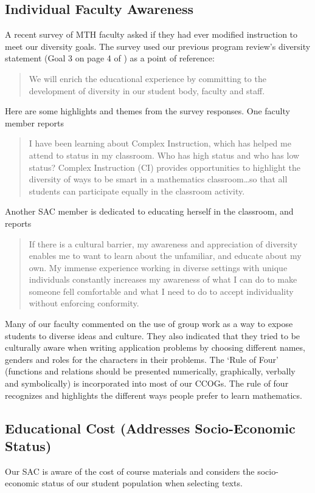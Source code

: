 \subsection{Individual Faculty Awareness}
A recent survey of MTH faculty asked if they had ever modified instruction to
meet our diversity goals. The survey used our previous program review's
diversity statement (Goal 3 on page 4 of \cite{mathprogramreview2003}) as a point of reference:
\begin{quote}
    We will enrich the educational experience by committing to the development
    of diversity in our student body, faculty and staff.
\end{quote}
Here are some highlights and themes from the survey responses. One faculty
member reports 
\begin{quote}
    I have been learning about Complex Instruction, which has helped me attend
    to status in my classroom. Who has high status and who has low status?
    Complex Instruction (CI) provides opportunities to highlight the diversity
    of ways to be smart in a mathematics classroom\ldots so that all students
    can participate equally in the classroom activity.
\end{quote}
Another SAC member is dedicated to educating herself in the classroom, and
reports
\begin{quote}
    If there is a cultural barrier, my awareness and appreciation of diversity
    enables me to want to learn about the unfamiliar, and educate about my own.
    My immense experience working in diverse settings with unique individuals
    constantly increases my awareness of what I can do to make someone fell
    comfortable and what I need to do to accept individuality without enforcing
    conformity.
\end{quote}
Many of our faculty commented on the use of group work as a way to expose
students to diverse ideas and culture.  They also indicated that they tried to
be culturally aware when writing application problems by choosing different
names, genders and roles for the characters in their problems. The `Rule of
Four' (functions and relations should be presented numerically, graphically,
verbally and symbolically) is incorporated into most of our CCOGs. The rule of
four recognizes and highlights the different ways people prefer to learn
mathematics.
\subsection{Educational Cost (Addresses Socio-Economic Status)}
Our SAC is aware of the cost of course materials and considers the
socio-economic status of our student population when selecting texts. 

